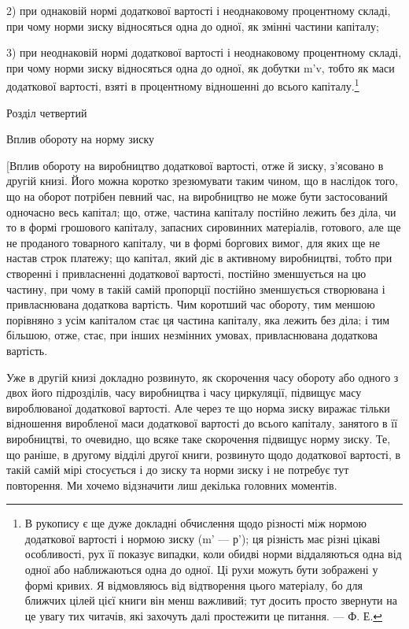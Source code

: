 \parcont{}  %
2) при однаковій нормі додаткової вартості і неоднаковому
процентному складі, при чому норми зиску відносяться одна до
одної, як змінні частини капіталу;

3) при неоднаковій нормі додаткової вартості і неоднаковому
процентному складі, при чому норми зиску відносяться одна до
одної, як добутки m'v, тобто як маси додаткової вартості,
взяті в процентному відношенні до всього капіталу.\footnote{
В рукопису є ще дуже докладні обчислення щодо різності між нормою
додаткової вартості і нормою зиску (m' — р'); ця різність має різні цікаві особливості,
рух її показує випадки, коли обидві норми віддаляються одна від
одної або наближаються одна до одної. Ці рухи можуть бути зображені у формі
кривих. Я відмовляюсь від відтворення цього матеріалу, бо для ближчих цілей
цієї книги він менш важливий; тут досить просто звернути на це увагу тих
читачів, які захочуть далі простежити це питання. — Ф. Е.
}

Розділ четвертий

Вплив обороту на норму зиску

[Вплив обороту на виробництво додаткової вартості, отже
й зиску, з’ясовано в другій книзі. Його можна коротко зрезюмувати
таким чином, що в наслідок того, що на оборот потрібен
певний час, на виробництво не може бути застосований одночасно
весь капітал; що, отже, частина капіталу постійно лежить без
діла, чи то в формі грошового капіталу, запасних сировинних
матеріалів, готового, але ще не проданого товарного капіталу,
чи в формі боргових вимог, для яких ще не настав строк платежу;
що капітал, який діє в активному виробництві, тобто при
створенні і привласненні додаткової вартості, постійно зменшується
на цю частину, при чому в такій самій пропорції постійно
зменшується створювана і привласнювана додаткова вартість.
Чим коротший час обороту, тим меншою порівняно з усім
капіталом стає ця частина капіталу, яка лежить без діла; і тим
більшою, отже, стає, при інших незмінних умовах, привласнювана
додаткова вартість.

Уже в другій книзі докладно розвинуто, як скорочення часу
обороту або одного з двох його підрозділів, часу виробництва
і часу циркуляції, підвищує масу вироблюваної додаткової вартості.
Але через те що норма зиску виражає тільки відношення
виробленої маси додаткової вартості до всього капіталу, занятого
в її виробництві, то очевидно, що всяке таке скорочення підвищує
норму зиску. Те, що раніше, в другому відділі другої
книги, розвинуто щодо додаткової вартості, в такій самій мірі
стосується і до зиску та норми зиску і не потребує тут повторення.
Ми хочемо відзначити лиш декілька головних моментів.

